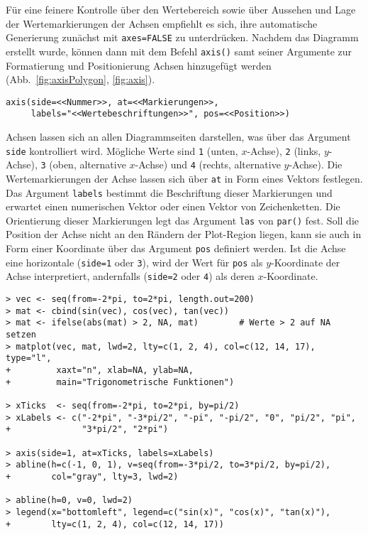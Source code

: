 Für eine feinere Kontrolle über den Wertebereich sowie über Aussehen und Lage der Wertemarkierungen der Achsen empfiehlt es sich, ihre automatische Generierung zunächst mit \lstinline!axes=FALSE! zu unterdrücken. Nachdem das Diagramm erstellt wurde, können dann mit dem Befehl \lstinline!axis()! samt seiner Argumente zur Formatierung und Positionierung Achsen hinzugefügt werden (Abb.\ \ref{fig:axisPolygon}, \ref{fig:axis}).
\begin{lstlisting}
axis(side=<<Nummer>>, at=<<Markierungen>>,
     labels="<<Wertebeschriftungen>>", pos=<<Position>>)
\end{lstlisting}

Achsen lassen sich an allen Diagrammseiten darstellen, was über das Argument \lstinline!side! kontrolliert wird. Mögliche Werte sind \lstinline!1! (unten, $x$-Achse), \lstinline!2! (links, $y$-Achse), \lstinline!3! (oben, alternative $x$-Achse) und \lstinline!4! (rechts, alternative $y$-Achse). Die Wertemarkierungen der Achse lassen sich über \lstinline!at! in Form eines Vektors festlegen. Das Argument \lstinline!labels! bestimmt die Beschriftung dieser Markierungen und erwartet einen numerischen Vektor oder einen Vektor von Zeichenketten. Die Orientierung dieser Markierungen legt das Argument \lstinline!las! von \lstinline!par()! fest. Soll die Position der Achse nicht an den Rändern der Plot-Region liegen, kann sie auch in Form einer Koordinate über das Argument \lstinline!pos! definiert werden. Ist die Achse eine horizontale (\lstinline!side=1! oder \lstinline!3!), wird der Wert für \lstinline!pos! als $y$-Koordinate der Achse interpretiert, andernfalls (\lstinline!side=2! oder \lstinline!4!) als deren $x$-Koordinate.
\begin{lstlisting}
> vec <- seq(from=-2*pi, to=2*pi, length.out=200)
> mat <- cbind(sin(vec), cos(vec), tan(vec))
> mat <- ifelse(abs(mat) > 2, NA, mat)        # Werte > 2 auf NA setzen
> matplot(vec, mat, lwd=2, lty=c(1, 2, 4), col=c(12, 14, 17), type="l",
+         xaxt="n", xlab=NA, ylab=NA,
+         main="Trigonometrische Funktionen")

> xTicks  <- seq(from=-2*pi, to=2*pi, by=pi/2)
> xLabels <- c("-2*pi", "-3*pi/2", "-pi", "-pi/2", "0", "pi/2", "pi",
+              "3*pi/2", "2*pi")

> axis(side=1, at=xTicks, labels=xLabels)
> abline(h=c(-1, 0, 1), v=seq(from=-3*pi/2, to=3*pi/2, by=pi/2),
+        col="gray", lty=3, lwd=2)

> abline(h=0, v=0, lwd=2)
> legend(x="bottomleft", legend=c("sin(x)", "cos(x)", "tan(x)"),
+        lty=c(1, 2, 4), col=c(12, 14, 17))
\end{lstlisting}

